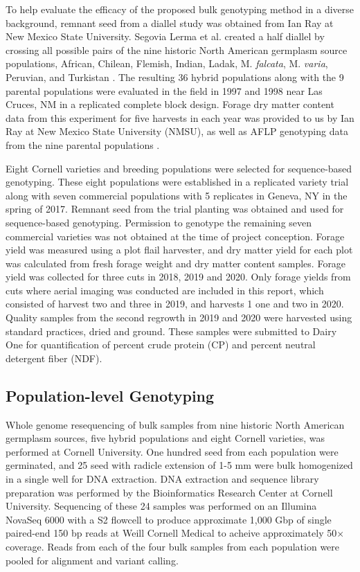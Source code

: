 \documentclass[12pt, letterpaper]{article}
\begin{document}
To help evaluate the efficacy of the proposed bulk genotyping method in a diverse background, remnant seed from a diallel study \parencite{segovia2004} was obtained from Ian Ray at New Mexico State University. Segovia Lerma et al. \parencite*{segovia2004} created a half diallel by crossing all possible pairs of the nine historic North American germplasm source populations, African, Chilean, Flemish, Indian, Ladak, M. \emph{falcata}, M. \emph{varia}, Peruvian, and Turkistan \parencite{barnes1977}. The resulting 36 hybrid populations along with the 9 parental populations were evaluated in the field in 1997 and 1998 near Las Cruces, NM in a replicated complete block design. Forage dry matter content data from this experiment for five harvests in each year was provided to us by Ian Ray at New Mexico State University (NMSU), as well as AFLP genotyping data from the nine parental populations \parencite[1544 AFLP markers;][]{segovia2004}.

Eight Cornell varieties and breeding populations were selected for sequence-based genotyping. These eight populations were established in a replicated variety trial along with seven commercial populations with 5 replicates in Geneva, NY in the spring of 2017. Remnant seed from the trial planting was obtained and used for sequence-based genotyping. Permission to genotype the remaining seven commercial varieties was not obtained at the time of project conception. Forage yield was measured using a plot flail harvester, and dry matter yield for each plot was calculated from fresh forage weight and dry matter content samples. Forage yield was collected for three cuts in 2018, 2019 and 2020. Only forage yields from cuts where aerial imaging was conducted are included in this report, which consisted of harvest two and three in 2019, and harvests 1 one and two in 2020. Quality samples from the second regrowth in 2019 and 2020 were harvested using standard practices, dried and ground. These samples were submitted to Dairy One for quantification of percent crude protein (CP) and percent neutral detergent fiber (NDF).




\subsection{Population-level Genotyping}

Whole genome resequencing of bulk samples from nine historic North American germplasm sources, five hybrid populations and eight Cornell varieties, was performed at Cornell University. One hundred seed from each population were germinated, and 25 seed with radicle extension of 1-5 mm were bulk homogenized in a single well for DNA extraction. DNA extraction and sequence library preparation was performed by the Bioinformatics Research Center at Cornell University. Sequencing of these 24 samples was performed on an Illumina NovaSeq 6000 with a S2 flowcell to produce approximate 1,000 Gbp of single paired-end 150 bp reads at Weill Cornell Medical to acheive approximately 50$\times$ coverage. Reads from each of the four bulk samples from each population were pooled for alignment and variant calling. 
\end{document}
